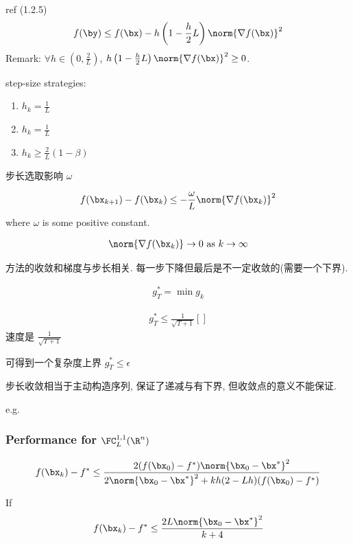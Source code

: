 ref (1.2.5)
\begin{align*}
    f(\by)\le f(\bx)-h\left( 1-\frac{h}{2}L \right)\norm{\nabla f(\bx)}^2
\end{align*}
Remark: $\forall h\in \left( 0,\frac{2}{L} \right)$, $h\left( 1-\frac{h}{2}L \right)\norm{\nabla f(\bx)}^2\ge 0$. 

step-size strategies:
\begin{enumerate}
    \item $h_k=\frac{1}{L}$
    \item $h_k=\frac{1}{L}$
    \item $h_k\ge \frac{2}{L}(1-\beta)$
\end{enumerate}
步长选取影响 $\omega$

\begin{align*}
    f(\bx_{k+1})-f(\bx_k)\le -\frac{\omega}{L}\norm{\nabla f(\bx_k)}^2
\end{align*}
where $\omega$ is some positive constant. 

\begin{align*}
    \norm{\nabla f(\bx_k)}\to 0\text{ as }k\to \infty
\end{align*}

方法的收敛和梯度与步长相关. 每一步下降但最后是不一定收敛的(需要一个下界). 

\begin{align*}
    g_T^*=\min g_k
\end{align*}

\begin{align*}
    g_T^*\le \frac{1}{\sqrt{T+1}}\left[  \right]
\end{align*}
速度是 $\frac{1}{\sqrt{T+1}}$

可得到一个复杂度上界 $g_T^*\le \epsilon$

步长收敛相当于主动构造序列, 保证了递减与有下界, 但收敛点的意义不能保证. 

e.g. 


\subsubsection{Performance for \texorpdfstring{$\FC_L^{1,1}(\R^n)$}. }
\begin{theorem}
    \begin{align*}
        f(\bx_k)-f^*\le \frac{2(f(\bx_0)-f^*)\norm{\bx_0-\bx^*}^2}{2\norm{\bx_0-\bx^*}^2+kh(2-Lh)(f(\bx_0)-f^*)}
    \end{align*}
\end{theorem}

\begin{corollary}
    If 
    \begin{align*}
        f(\bx_k)-f^*\le\frac{2L\norm{\bx_0-\bx^*}^2}{k+4}
    \end{align*}
\end{corollary}


